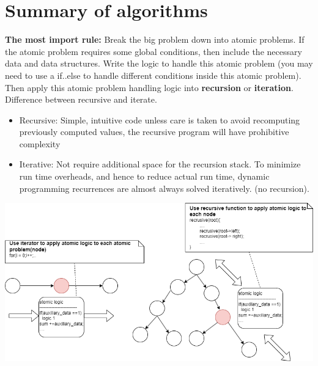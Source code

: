 \documentclass[a4paper,11pt,twoside]{book}
\begin{document}
	
\section{Summary of algorithms}

	\par \textbf{The most import rule:} Break the big problem down into atomic problems. If the atomic problem requires some global conditions, then include the necessary data and data structures. Write the logic to handle this atomic problem (you may need to use a if..else to handle different conditions inside this atomic problem). Then apply this atomic problem handling logic into \textbf{recursion} or \textbf{iteration}. Difference between recursive and iterate.
	
	\begin{itemize}
		\item Recursive: Simple, intuitive code unless care is taken to avoid recomputing previously computed values, the recursive program will have prohibitive complexity
		
		\item Iterative: Not require additional space for the recursion stack. To minimize run time overheads, and hence to reduce actual run time, dynamic programming recurrences are almost always solved iteratively. (no recursion).
	\end{itemize}
	

\begin{center}
	\includegraphics[scale=0.50]{pics/rule.drawio.png}
\end{center}
\end{document}

